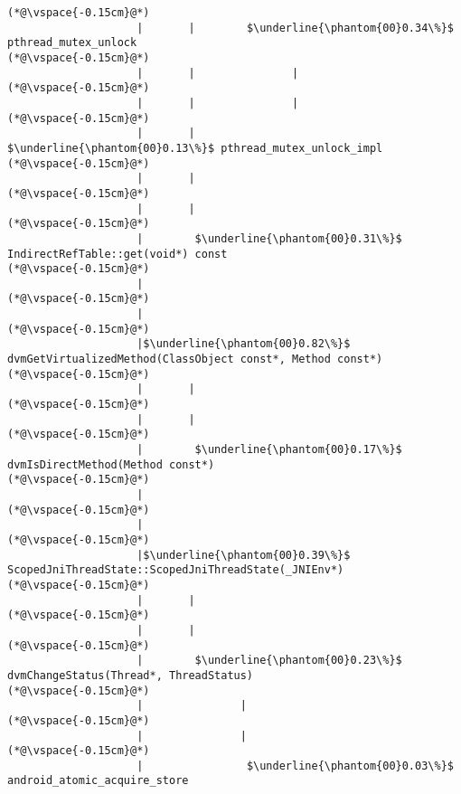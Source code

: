 \begin{lstlisting}[caption=Metodikutsu C$\to$Java 20 viiteparametrilla, label=profile:C2JBenchmark00206, numberbychapter=true, frame=lines, float, floatplacement=t]
(*@\vspace{-0.15cm}@*)
                    |       |        $\underline{\phantom{00}0.34\%}$ pthread_mutex_unlock
(*@\vspace{-0.15cm}@*)
                    |       |               |
(*@\vspace{-0.15cm}@*)
                    |       |               |
(*@\vspace{-0.15cm}@*)
                    |       |                $\underline{\phantom{00}0.13\%}$ pthread_mutex_unlock_impl
(*@\vspace{-0.15cm}@*)
                    |       |
(*@\vspace{-0.15cm}@*)
                    |       |
(*@\vspace{-0.15cm}@*)
                    |        $\underline{\phantom{00}0.31\%}$ IndirectRefTable::get(void*) const
(*@\vspace{-0.15cm}@*)
                    |
(*@\vspace{-0.15cm}@*)
                    |
(*@\vspace{-0.15cm}@*)
                    |$\underline{\phantom{00}0.82\%}$ dvmGetVirtualizedMethod(ClassObject const*, Method const*)
(*@\vspace{-0.15cm}@*)
                    |       |
(*@\vspace{-0.15cm}@*)
                    |       |
(*@\vspace{-0.15cm}@*)
                    |        $\underline{\phantom{00}0.17\%}$ dvmIsDirectMethod(Method const*)
(*@\vspace{-0.15cm}@*)
                    |
(*@\vspace{-0.15cm}@*)
                    |
(*@\vspace{-0.15cm}@*)
                    |$\underline{\phantom{00}0.39\%}$ ScopedJniThreadState::ScopedJniThreadState(_JNIEnv*)
(*@\vspace{-0.15cm}@*)
                    |       |
(*@\vspace{-0.15cm}@*)
                    |       |
(*@\vspace{-0.15cm}@*)
                    |        $\underline{\phantom{00}0.23\%}$ dvmChangeStatus(Thread*, ThreadStatus)
(*@\vspace{-0.15cm}@*)
                    |               |
(*@\vspace{-0.15cm}@*)
                    |               |
(*@\vspace{-0.15cm}@*)
                    |                $\underline{\phantom{00}0.03\%}$ android_atomic_acquire_store

\end{lstlisting}
